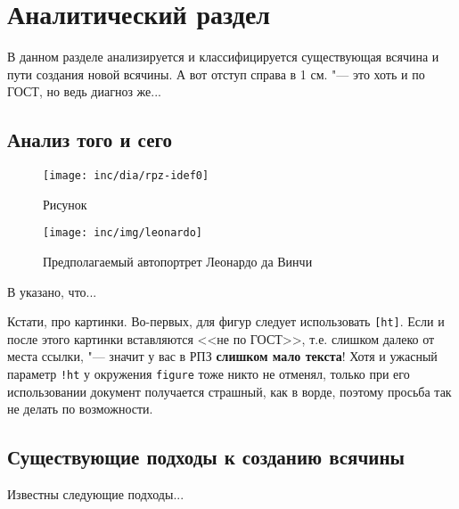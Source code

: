 \chapter{Аналитический раздел}
\label{cha:analysis}
%
%
В данном разделе анализируется и классифицируется существующая всячина и пути создания новой всячины. А вот отступ справа в 1 см. "--- это хоть и по ГОСТ, но ведь диагноз же...

\section{Анализ того и сего}


\begin{figure}
  \centering
  \texttt{[image: inc/dia/rpz-idef0]}
  \caption{Рисунок}
  \label{fig:fig01}
\end{figure}

\begin{figure}
  \centering
  \texttt{[image: inc/img/leonardo]}
  \caption{Предполагаемый автопортрет Леонардо да Винчи}
  \label{fig:leonardo}
\end{figure}

В \cite{Pup09} указано, что...

Кстати, про картинки. Во-первых, для фигур следует использовать \texttt{[ht]}. Если и после этого картинки вставляются <<не по ГОСТ>>, т.е. слишком далеко от места ссылки, "--- значит у вас в РПЗ \textbf{слишком мало текста}! Хотя и ужасный параметр \texttt{!ht} у окружения \texttt{figure} тоже никто не отменял, только при его использовании документ получается страшный, как в ворде, поэтому просьба так не делать по возможности.

\section{Существующие подходы к созданию всячины}

Известны следующие подходы...

